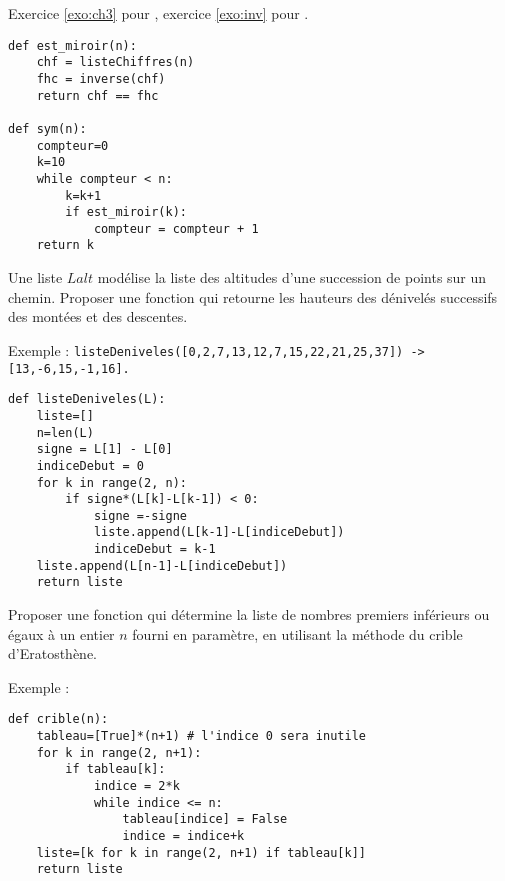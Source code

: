 \begin{Answer} Exercice \ref{exo:ch3} pour , exercice \ref{exo:inv} pour .
\begin{lstlisting}
def est_miroir(n):
    chf = listeChiffres(n) 
    fhc = inverse(chf)
    return chf == fhc

def sym(n):
    compteur=0
    k=10
    while compteur < n:
        k=k+1
        if est_miroir(k):
            compteur = compteur + 1
    return k
\end{lstlisting}
\end{Answer}
\begin{Exercise}[title = {Mines-Ponts 2018}] Une liste $Lalt$ modélise la liste des altitudes d'une succession de points sur un chemin. Proposer une fonction qui retourne les hauteurs des dénivelés successifs des montées et des descentes.

Exemple : {\tt listeDeniveles([0,2,7,13,12,7,15,22,21,25,37]) -> [13,-6,15,-1,16].}
\end{Exercise}
\begin{Answer}
\begin{lstlisting}
def listeDeniveles(L):
    liste=[]
    n=len(L)
    signe = L[1] - L[0]
    indiceDebut = 0
    for k in range(2, n):
        if signe*(L[k]-L[k-1]) < 0: 
            signe =-signe
            liste.append(L[k-1]-L[indiceDebut])
            indiceDebut = k-1
    liste.append(L[n-1]-L[indiceDebut])
    return liste
\end{lstlisting}
\end{Answer}
\begin{Exercise}[label=exo:crible]
Proposer une fonction qui détermine la liste de nombres premiers inférieurs ou égaux à un entier $n$ fourni en paramètre, en utilisant la méthode du crible d'Eratosthène. 

Exemple : 
\end{Exercise}
\begin{Answer}
\begin{lstlisting}
def crible(n):
    tableau=[True]*(n+1) # l'indice 0 sera inutile
    for k in range(2, n+1):
        if tableau[k]:
            indice = 2*k
            while indice <= n:
                tableau[indice] = False
                indice = indice+k
    liste=[k for k in range(2, n+1) if tableau[k]]
    return liste
\end{lstlisting}
\end{Answer}
